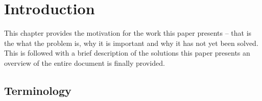 \documentclass[a4paper,12pt,twoside,openright]{report}
\begin{document}
\pagestyle{empty}
\singlespacing

\onehalfspacing

\singlespacing


\setcounter{page}{0}
\pagestyle{plain}
\tableofcontents

\onehalfspacing


\chapter{Introduction}
\setcounter{page}{1}

This chapter provides the motivation for the work this paper presents -- that
is the what the problem is, why it is important and why it has not yet been
solved. This is followed with a brief description of the solutions this paper
presents an overview of the entire document is finally provided.

\section{Terminology}
\end{document}

